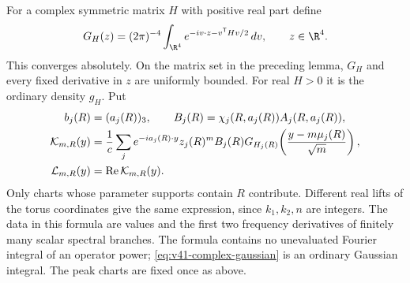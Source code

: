For a complex symmetric matrix $H$ with positive real part define
\begin{equation}\label{eq:v41-complex-gaussian}
 G_H(z)=(2\pi)^{-4}\int_{\R^4}
                 e^{-iv\cdot z-v^{\mathsf T}Hv/2}\,dv,
                    \qquad z\in\R^4.
\end{equation}
This converges absolutely. On the matrix set in the preceding lemma,
$G_H$ and every fixed derivative in $z$ are uniformly bounded. For
real $H>0$ it is the ordinary density $g_H$. Put
\begin{align}
 b_j(R)&=(a_j(R))_3,\qquad
 B_j(R)=\chi_j(R,a_j(R))A_j(R,a_j(R)),\notag\\
 \mathcal K_{m,R}(y)
   &=\frac1c\sum_j e^{-ia_j(R)\cdot y}z_j(R)^m B_j(R)
          G_{H_j(R)}\!\left(\frac{y-m\mu_j(R)}{\sqrt m}\right),\notag\\
 \mathcal L_{m,R}(y)&=\operatorname{Re}\mathcal K_{m,R}(y).
                                      \label{eq:v41-transition-kernel}
\end{align}
Only charts whose parameter supports contain $R$ contribute. Different
real lifts of the torus coordinates give the same expression, since
$k_1,k_2,n$ are integers. The data in this formula are values and the
first two frequency derivatives of finitely many scalar spectral
branches. The formula contains no unevaluated Fourier integral of an
operator power; \eqref{eq:v41-complex-gaussian} is an ordinary Gaussian
integral. The peak charts are fixed once as above.

